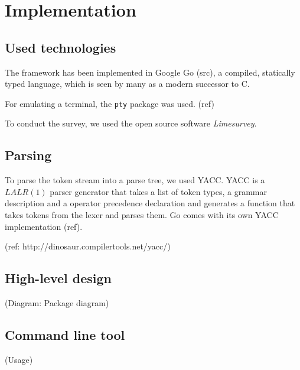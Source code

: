 \documentclass[paper=a4,twoside,abstract=on,cleardoublepage=empty,numbers=noenddot,toc=bib,12pt,appendixprefix=true]{scrreprt}
\begin{document}






\chapter{Implementation}
\label{sec:implementation}

\section{Used technologies}

The framework has been implemented in Google Go (src), a compiled, statically typed language, which is seen by many as a modern successor to C.

For emulating a terminal, the \texttt{pty} package was used.
(ref)

To conduct the survey, we used the open source software \emph{Limesurvey}.

\section{Parsing}

To parse the token stream into a parse tree, we used \textsc{YACC}. \textsc{YACC} is a $LALR(1)$ parser generator that takes a list of token types, a grammar description and a operator precedence declaration and generates a function that takes tokens from the lexer and parses them. Go comes with its own YACC implementation (ref).

(ref: http://dinosaur.compilertools.net/yacc/)

\section{High-level design}

(Diagram: Package diagram)

\section{Command line tool}

(Usage)
\end{document}
